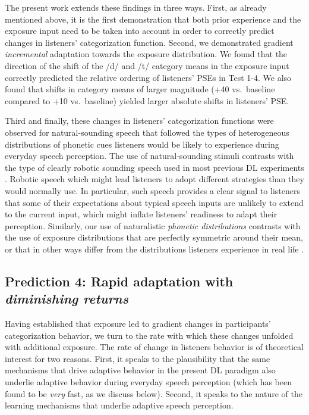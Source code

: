 \documentclass[
  11pt,
  man,mask,floatsintext]{apa6}
\begin{document}
The present work extends these findings in three ways. First, as already mentioned above, it is the first demonstration that both prior experience and the exposure input need to be taken into account in order to correctly predict changes in listeners' categorization function. Second, we demonstrated gradient \emph{incremental} adaptation towards the exposure distribution. We found that the direction of the shift of the /d/ and /t/ category means in the exposure input correctly predicted the relative ordering of listeners' PSEs in Test 1-4. We also found that shifts in category means of larger magnitude (+40 vs.~baseline compared to +10 vs.~baseline) yielded larger absolute shifts in listeners' PSE.

Third and finally, these changes in listeners' categorization functions were observed for natural-sounding speech that followed the types of heterogeneous distributions of phonetic cues listeners would be likely to experience during everyday speech perception. The use of natural-sounding stimuli contrasts with the type of clearly robotic sounding speech used in most previous DL experiments \autocites[for notable exceptions, see][]{chladkova2017,theodore-monto2019}. Robotic speech which might lead listeners to adopt different strategies than they would normally use. In particular, such speech provides a clear signal to listeners that some of their expectations about typical speech inputs are unlikely to extend to the current input, which might inflate listeners' readiness to adapt their perception. Similarly, our use of naturalistic \emph{phonetic distributions} contrasts with the use of exposure distributions that are perfectly symmetric around their mean, or that in other ways differ from the distributions listeners experience in real life \autocite[for a notable exception,][]{chladkova2017}.

\subsection{\texorpdfstring{Prediction 4: Rapid adaptation with \emph{diminishing returns}}{Prediction 4: Rapid adaptation with diminishing returns}}\label{prediction-4-rapid-adaptation-with-diminishing-returns}

Having established that exposure led to gradient changes in participants' categorization behavior, we turn to the rate with which these changes unfolded with additional exposure. The rate of change in listeners behavior is of theoretical interest for two reasons. First, it speaks to the plausibility that the same mechanisms that drive adaptive behavior in the present DL paradigm also underlie adaptive behavior during everyday speech perception (which has been found to be \emph{very} fast, as we discuss below). Second, it speaks to the nature of the learning mechanisms that underlie adaptive speech perception.
\end{document}
